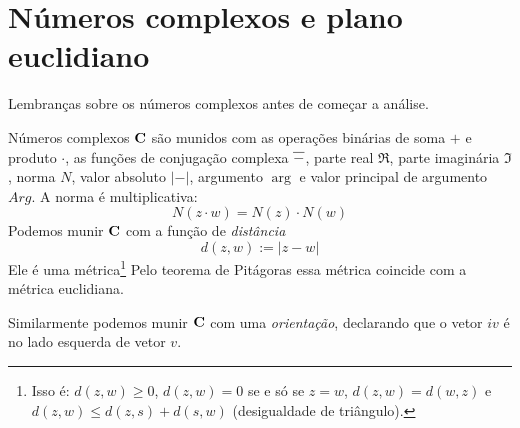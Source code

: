 \section*{Números complexos e plano euclidiano}

Lembranças sobre os números complexos antes de começar a análise.

Números complexos $\mathbf{C}$ são munidos com
\marginnote{
\begin{align*}
+,\cdot &: \C \times \C \to \C,\quad z,w \mapsto z+w,\quad z,w \mapsto z\cdot w, \\
\ol{} &: \C \to \C, \quad z\mapsto \ol{z}, \\
\Re,\Im &: \C \to \R, \quad z \mapsto \Re z,\quad z \mapsto \Im z, \\
N,|-| &: \C \to \R_{\geq 0},\quad z \mapsto N(z),\quad z \mapsto |z|, \\
\arg &: \C \to \R/2\pi\Z,\quad z \mapsto \arg z, \\
Arg &: \C \to [0,2\pi),\quad z\mapsto Arg z.
\end{align*}}
as operações binárias
de soma $+$ e produto $\cdot$,
as funções de 
conjugação complexa $\overline{-}$,
parte real $\Re $, parte imaginária $\Im$,
norma $N$, valor absoluto $|-|$,
argumento $\arg$
e valor principal de argumento $Arg$.
A norma é multiplicativa:
\[ N(z\cdot w) = N(z) \cdot N(w) \]
Podemos munir $\mathbf{C}$ com a função de \emph{distância}
\[ d(z,w) := |z-w| \]
Ele é uma métrica\footnote{Isso é: $d(z,w) \geq 0$, $d(z,w) = 0$ se e só se $z=w$,
$d(z,w) = d(w,z)$ e $d(z,w) \leq d(z,s) + d(s,w)$ (desigualdade de triângulo).}
Pelo teorema de Pitágoras essa métrica coincide com a métrica euclidiana.

Similarmente podemos munir $\mathbf{C}$ com uma \emph{orientação},
declarando que o vetor $i v$ é no lado esquerda de vetor $v$.

